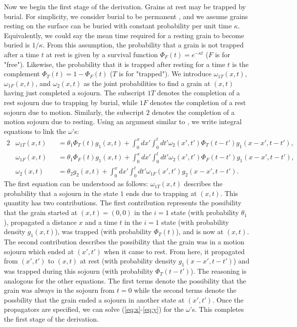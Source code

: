 \documentclass[]{agujournal2018}
\newcommand\om{\omega}
\begin{document}
Now we begin the first stage of the derivation.
Grains at rest may be trapped by burial.
For simplicity, we consider burial to be permanent \citep[e.g.][]{Wu2019}, and we assume grains resting on the surface can be buried with constant probability per unit time $\kappa$.
Equivalently, we could say the mean time required for a resting grain to become buried is $1/\kappa$.
From this assumption, the probability that a grain is not trapped after a time $t$ at rest is given by a survival function $\Phi_F(t) = e^{-\kappa t}$ ($F$ is for "free"). Likewise, the probability that it is trapped after resting for a time $t$ is the complement $\Phi_T(t) = 1-\Phi_F(t)$ ($T$ is for "trapped").
We introduce $\omega_{1T}(x,t)$, $\omega_{1F}(x,t)$, and $\omega_2(x,t)$ as the joint probabilities to find a grain at $(x,t)$ having just completed a sojourn.
The subscript ${1T}$ denotes the completion of a rest sojourn due to trapping by burial, while $1F$ denotes the completion of a rest sojourn due to motion.
Similarly, the subscript $2$ denotes the completion of a motion sojourn due to resting.
Using an argument similar to \citet{Weiss1994}, we write integral equations to link the $\omega$'s: 
\begin{alignat}{2}
&\om_{1T}(x,t) &&= \theta_1\Phi_T(t)g_1(x,t) + \int_0^x dx' \int_0^t dt' \om_2(x',t')\Phi_T(t-t')g_1(x-x',t-t')\label{eq:x},\\
&\om_{1F}(x,t) &&= \theta_1\Phi_F(t)g_1(x,t) + \int_0^x dx' \int_0^t dt' \om_2(x',t') \Phi_F(t-t') g_1(x-x',t-t'),\\
&\om_2(x,t) &&= \theta_2 g_2(x,t) + \int_0^x dx' \int_0^t dt' \om_{1F}(x',t')g_2(x-x',t-t'). \label{eq:y}
\end{alignat}
The first equation can be understood as follows: $\omega_{1T}(x,t)$ describes the probability that a sojourn in the state $1$ ends due to trapping at $(x,t)$. This quantity has two contributions. The first contribution represents the possibility that the grain started at $(x,t)=(0,0)$ in the $i=1$ state (with probability $\theta_1$), propagated a distance $x$ and a time $t$ in the $i=1$ state (with probability density $g_1(x,t)$), was trapped (with probability $\Phi_T(t)$), and is now at $(x,t)$. 
The second contribution describes the possibility that the grain was in a motion sojourn which ended at $(x',t')$ when it came to rest. From here, it propagated from $(x',t')$ to $(x,t)$ at rest (with probability density $g_1(x-x',t-t')$) and was trapped during this sojourn (with probability $\Phi_T(t-t')$).
The reasoning is analogous for the other equations. The first terms denote the possibility that the grain was always in the sojourn from $t=0$ while the second terms denote the possbility that the grain ended a sojourn in another state at $(x',t')$.
Once the propagators are specified, we can solve (\ref{eq:x}-\ref{eq:y}) for the $\omega$'s. This completes the first stage of the derivation.
\end{document}

